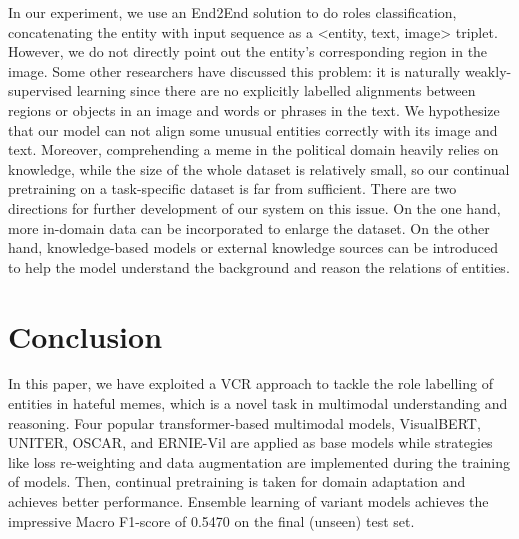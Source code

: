 \documentclass[11pt]{article}
\begin{document}
In our experiment, we use an End2End solution to do roles classification, concatenating the entity with input sequence as a <entity, text, image> triplet. However, we do not directly point out the entity's corresponding region in the image. Some other researchers \citep{li2020oscar} have discussed this problem: it is naturally weakly-supervised learning since there are no explicitly labelled alignments between regions or objects in an image and words or phrases in the text. We hypothesize that our model can not align some unusual entities correctly with its image and text. Moreover, comprehending a meme in the political domain heavily relies on knowledge, while the size of the whole dataset is relatively small, so our continual pretraining on a task-specific dataset is far from sufficient. There are two directions for further development of our system on this issue. On the one hand, more in-domain data can be incorporated to enlarge the dataset. On the other hand, knowledge-based models or external knowledge sources can be introduced to help the model understand the background and reason the relations of entities.




\section{Conclusion}

In this paper, we have exploited a VCR approach to tackle the role labelling of entities in hateful memes, which is a novel task in multimodal understanding and reasoning. Four popular transformer-based multimodal models, VisualBERT, UNITER, OSCAR, and ERNIE-Vil are applied as base models while strategies like loss re-weighting and data augmentation are implemented during the training of models. Then, continual pretraining is taken for domain adaptation and achieves better performance. Ensemble learning of variant models achieves the impressive Macro F1-score of 0.5470 on the final (unseen) test set.




\end{document}
